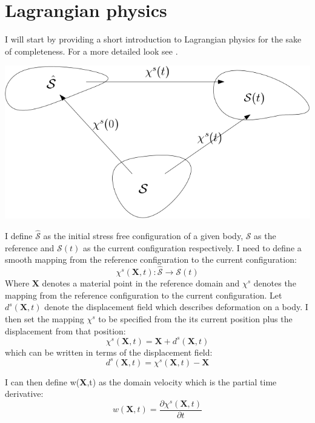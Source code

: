 \section{Lagrangian physics}
I will start by providing a short introduction to Lagrangian physics for the sake of completeness. For a more detailed look see \cite{Holzapfel2000}.
\begin{center}
\includegraphics[scale=0.4]{continuum_mapping.png}
\end{center}
I define $ \hat{\mathcal{S}}$ as the initial stress free configuration of a given body, $\mathcal{S}$ as the reference and $\mathcal{S}(t)$ as the current configuration respectively.
I need to define a smooth mapping from the reference configuration to the current configuration:
\begin{equation}
\chi^s(\textbf{X},t) : \hat{\mathcal{S}} \rightarrow \mathcal{S}(t)     
\end{equation}
Where $\textbf{X}$ denotes a material point in the reference domain and $\chi^s$ denotes the mapping from the reference configuration to the current configuration. Let $d^s(\textbf{X},t)$ denote the displacement field which describes deformation on a body. I then set the mapping $\chi^s$   to be specified from the its current position plus the displacement from that position:
\begin{equation}
 \chi^s(\textbf{X},t) = \textbf{X}  + d^s(\textbf{X} ,t) 
\end{equation}
which can be written in terms of the displacement field:
\begin{equation}
 d^s(\textbf{X},t) = \chi^s(\textbf{X},t) -\textbf{X}   
\end{equation}

I can then define w(\textbf{X},t) as  the domain velocity which is the partial time derivative: 
\begin{equation}
 w(\textbf{X},t) = \frac{\partial \chi^s(\textbf{X},t)}{\partial t}   
\end{equation}

